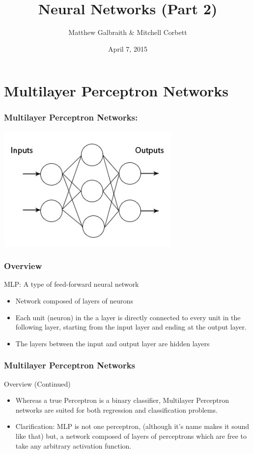 \documentclass{beamer}
\title[Neural Networks (Part 2)]{Neural Networks (Part 2)}
\author{Matthew Galbraith \& Mitchell Corbett}
\date{April 7, 2015}
\begin{document}
\begin{frame}
    \titlepage
\end{frame}

\section{Multilayer Perceptron Networks}
\begin{frame}
    \frametitle{Multilayer Perceptron Networks:}
            \includegraphics[width=9cm]{mlp.jpg}
\end{frame}

\begin{frame}
    \frametitle{Overview}
    \begin{block}{MLP: A type of feed-forward neural network} 
        \begin{itemize}
            \item Network composed of layers of neurons
            \item Each unit (neuron) in the a layer is directly connected to every unit in the following layer, starting from the input layer and ending at the output layer.
            \item The layers between the input and output layer are hidden layers
        \end{itemize}
    \end{block}
\end{frame}

\begin{frame}
    \frametitle{Multilayer Perceptron Networks}
\begin{block}{Overview (Continued)} 
    \begin{itemize}
        \item Whereas a true Perceptron is a binary classifier, Multilayer Perceptron networks are suited for both regression and classification problems.
        \item Clarification: MLP is not one perceptron, (although it's name makes it sound like that) but, a network composed of layers of perceptrons which are free to take any arbitrary activation function. 
    \end{itemize}
\end{block}
\end{frame}
\end{document}
